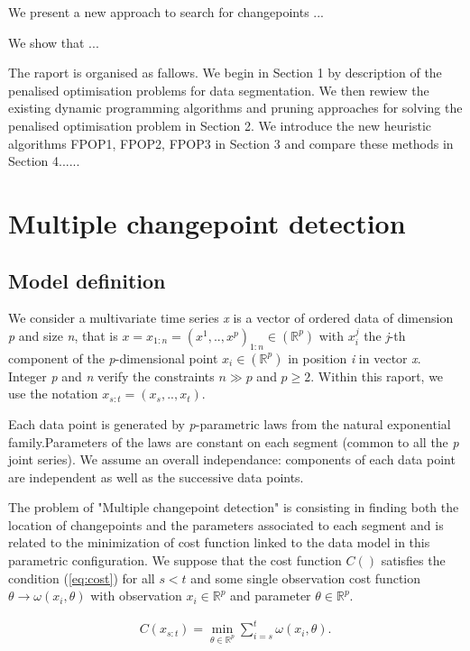 \documentclass[a4paper,12pt]{article}
\begin{document}
	We present a new approach to search for changepoints ...
	
	We show that ...
	
	The raport is organised as fallows. We begin in Section 1 by description of the penalised optimisation problems for data segmentation. We then rewiew the existing dynamic programming algorithms and pruning approaches for solving the penalised optimisation problem in Section 2. We introduce the new heuristic algorithms FPOP1, FPOP2, FPOP3 in Section 3 and compare these methods in Section 4......
	\newpage 
	
	\section{ Multiple changepoint detection}
	\label{section1}
		\subsection{Model definition}
		\label{Model definition}
		
		We consider a multivariate time series \textit{x} is a vector of ordered data of dimension \textit{p} and size \textit{n}, that is $x = x_{1:n} = (x^1,.., x^p)_{1:n}\in(\mathbb{R}^p)$ with $x_i^j$ the \textit{j}-th component of the \textit{p}-dimensional point  $x_i\in(\mathbb{R}^p)$ in position \textit{i} in vector \textit{x}. Integer \textit{p} and \textit{n} verify the constraints $n \gg p$ and $p\ge 2$. Within this raport, we use the notation  $x _{s:t} = (x_s,.., x_t)$.
		
		Each data point is generated by \textit{p}-parametric laws from the natural exponential family.Parameters of the laws are constant on each segment (common to all the \textit{p} joint series). We assume an overall independance: components of each data point are independent as well as the successive data points.
		
		The problem of "Multiple changepoint detection" is consisting in finding both the location of changepoints and the parameters associated to each segment and is related to the minimization of cost function linked to the data model in this parametric configuration. We suppose that the cost function $C()$ satisfies the condition (\ref*{eq:cost}) for all $s < t$ and some single observation cost function $\theta \rightarrow \omega(x_i,\theta)$ with observation $x_i\in \mathbb{R}^p$ and parameter $\theta \in \mathbb{R}^p$.
		
		\begin{equation}
			\begin{gathered}
			C(x_{s:t}) = \min_{\theta \in \mathbb{R}^p} \sum_{i=s}^{t}\omega(x_i,\theta).
			\end{gathered}
			\label{eq:cost}
		\end{equation}
	
\end{document}
